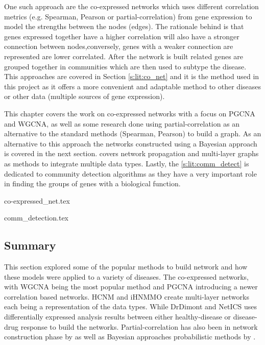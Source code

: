 One such approach are the co-expressed networks which uses different correlation metrics (e.g. Spearman, Pearson or partial-correlation) from gene expression to model the strengths between the nodes (edges). The rationale behind is that genes expressed together have a higher correlation will also have a stronger connection between nodes,conversely, genes with a weaker connection are represented are lower correlated. After the network is built related genes are grouped together in communities which are then used to subtype the disease. This approaches are covered in Section \ref{s:lit:co_net} and it is the method used in this project as it offers a more convenient and adaptable method to other diseases or other data (multiple sources of gene expression).

This chapter covers the work on co-expressed networks with a focus on PGCNA and WGCNA, as well as some research done using partial-correlation as an alternative to the standard methods (Spearman, Pearson) to build a graph. As an alternative to this approach the networks constructed using a Bayesian approach is covered in the next section.  covers network propagation and multi-layer graphs as methods to integrate multiple data types. Lastly, the \cref{s:lit:comm_detect} is dedicated to community detection algorithms as they have a very important role in finding the groups of genes with a biological function.

{co-expressed_net.tex}

{comm_detection.tex}


\subsection{Summary} 

This section explored some of the popular methods to build network and how these models were applied to a variety of diseases. The co-expressed networks, with WGCNA \cite{Langfelder2008-sn} being the most popular method and PGCNA \cite{Care2019-ij} introducing a newer correlation based networks. HCNM \cite{Vangimalla2021-fc} and iHNMMO \citet{Peng2017-ik} create multi-layer networks each being a representation of the data types. While DrDimont \cite{Hiort2022-lk} and NetICS \citet{Dimitrakopoulos2018-br} uses differentially expressed analysis results between either healthy-disease or disease-drug response to build the networks. Partial-correlation has also been in network construction phase by \citet{De_la_Fuente2004-ts} as well as Bayesian approaches  probabilistic methods by \cite{Nakazawa2021-yq, Tamada2011-ok, Tanaka2020-mw}.

